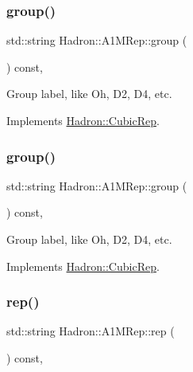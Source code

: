 \subsubsection{\texorpdfstring{group()}{group()}\hspace{0.1cm}{\footnotesize\ttfamily [1/2]}}
{\footnotesize\ttfamily std\+::string Hadron\+::\+A1\+M\+Rep\+::group (\begin{DoxyParamCaption}{ }\end{DoxyParamCaption}) const\hspace{0.3cm}{\ttfamily [inline]}, {\ttfamily [virtual]}}

Group label, like Oh, D2, D4, etc. 

Implements \mbox{\hyperlink{structHadron_1_1CubicRep_a0748f11ec87f387062c8e8981339a29c}{Hadron\+::\+Cubic\+Rep}}.

\mbox{\label{structHadron_1_1A1MRep_ad0776ade0fd54254ee8d0e3ba00b1f33}} 
\subsubsection{\texorpdfstring{group()}{group()}\hspace{0.1cm}{\footnotesize\ttfamily [2/2]}}
{\footnotesize\ttfamily std\+::string Hadron\+::\+A1\+M\+Rep\+::group (\begin{DoxyParamCaption}{ }\end{DoxyParamCaption}) const\hspace{0.3cm}{\ttfamily [inline]}, {\ttfamily [virtual]}}

Group label, like Oh, D2, D4, etc. 

Implements \mbox{\hyperlink{structHadron_1_1CubicRep_a0748f11ec87f387062c8e8981339a29c}{Hadron\+::\+Cubic\+Rep}}.

\mbox{\label{structHadron_1_1A1MRep_ace32cdcf9819db0556ec88464d828e6f}} 
\subsubsection{\texorpdfstring{rep()}{rep()}\hspace{0.1cm}{\footnotesize\ttfamily [1/2]}}
{\footnotesize\ttfamily std\+::string Hadron\+::\+A1\+M\+Rep\+::rep (\begin{DoxyParamCaption}{ }\end{DoxyParamCaption}) const\hspace{0.3cm}{\ttfamily [inline]}, {\ttfamily [virtual]}}

